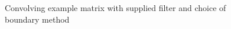 \begin{figure}[H]
   \small
   
   \caption{Convolving example matrix with supplied filter and choice of boundary method}
\end{figure}
